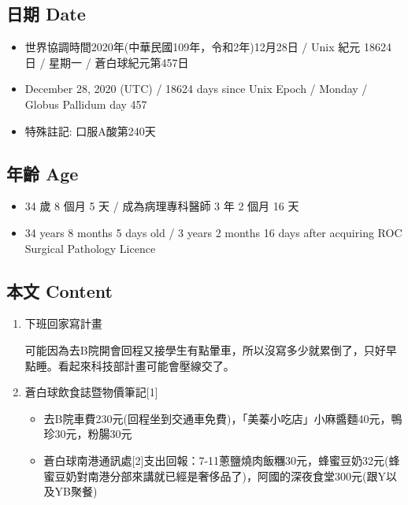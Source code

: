 \documentclass[
]{article}
\providecommand{\tightlist}{%
  \setlength{\itemsep}{0pt}\setlength{\parskip}{0pt}}
\begin{document}
\hypertarget{ux65e5ux671f-date-27}{%
\subsection{日期 Date}\label{ux65e5ux671f-date-27}}

\begin{itemize}
\tightlist
\item
  世界協調時間2020年(中華民國109年，令和2年)12月28日 / Unix 紀元 18624
  日 / 星期一 / 蒼白球紀元第457日
\item
  December 28, 2020 (UTC) / 18624 days since Unix Epoch / Monday /
  Globus Pallidum day 457
\item
  特殊註記: 口服A酸第240天
\end{itemize}

\hypertarget{ux5e74ux9f61-age-27}{%
\subsection{年齡 Age}\label{ux5e74ux9f61-age-27}}

\begin{itemize}
\tightlist
\item
  34 歲 8 個月 5 天 / 成為病理專科醫師 3 年 2 個月 16 天
\item
  34 years 8 months 5 days old / 3 years 2 months 16 days after
  acquiring ROC Surgical Pathology Licence
\end{itemize}

\hypertarget{ux672cux6587-content-27}{%
\subsection{本文 Content}\label{ux672cux6587-content-27}}

\begin{enumerate}
\def\labelenumi{\arabic{enumi}.}
\item
  下班回家寫計畫

  可能因為去B院開會回程又接學生有點暈車，所以沒寫多少就累倒了，只好早點睡。看起來科技部計畫可能會壓線交了。
\item
  蒼白球飲食誌暨物價筆記{[}1{]}

  \begin{itemize}
  \tightlist
  \item
    去B院車費230元(回程坐到交通車免費)，「美蓁小吃店」小麻醬麵40元，鴨珍30元，粉腸30元
  \item
    蒼白球南港通訊處{[}2{]}支出回報：7-11蔥鹽燒肉飯糰30元，蜂蜜豆奶32元(蜂蜜豆奶對南港分部來講就已經是奢侈品了)，阿國的深夜食堂300元(跟Y以及YB聚餐)
  \end{itemize}
\end{enumerate}
\end{document}
